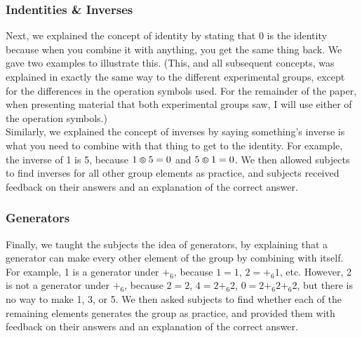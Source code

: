 \documentclass[11pt]{article}
\def\hex{\mathrel{%
    \mathchoice{\HEX}{\HEX}{\scriptsize\HEX}{\tiny\HEX}%
}}
\def\HEX{{%
    \setbox0\hbox{\varhexagon}%
    \rlap{\hbox to \wd0{\hss\raisebox{1 pt}{\scaleobj{0.6}{6}}\hss}}\box0
}}
\begin{document}
\subsubsection{Indentities \& Inverses}
Next, we explained the concept of identity by stating that 0 is the identity because when you combine it with anything, you get the same thing back. We gave two examples to illustrate this. (This, and all subsequent concepts, was explained in exactly the same way to the different experimental groups, except for the differences in the operation symbols used. For the remainder of the paper, when presenting material that both experimental groups saw, I will use either of the operation symbols.)\\[11pt]
Similarly, we explained the concept of inverses by saying something's inverse is what you need to combine with that thing to get to the identity. For example, the inverse of 1 is 5, because $1 \hex 5 = 0$ and $5 \hex 1 = 0$. We then allowed subjects to find inverses for all other group elements as practice, and subjects received feedback on their answers and an explanation of the correct answer.
\subsubsection{Generators}
Finally, we taught the subjects the idea of generators, by explaining that a generator can make every other element of the group by combining with itself. For example, 1 is a generator under $+_6$, because $1 = 1$, $2 = +_6 1$, etc. However, 2 is not a generator under $+_6$, because $2 = 2$, $4 = 2 +_6 2$, $0 = 2 +_6 2 +_6 2$, but there is no way to make 1, 3, or 5. We then asked subjects to find whether each of the remaining elements generates the group as practice, and provided them with feedback on their answers and an explanation of the correct answer.
\end{document}
